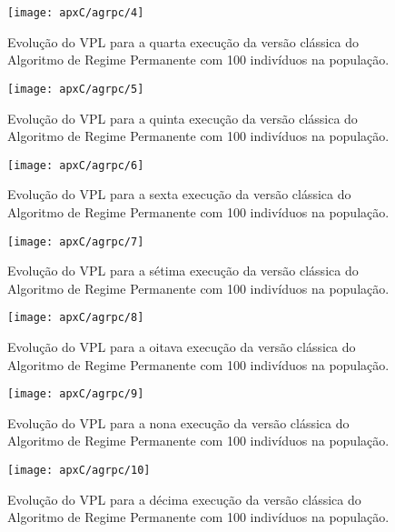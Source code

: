 \begin{figure}[H]
\centering
\texttt{[image: apxC/agrpc/4]}
\caption{Evolução do VPL para a quarta execução da versão clássica do Algoritmo de Regime Permanente com 100 indivíduos na população.}
\label{fig:graphRPC3-04}
\end{figure}

\begin{figure}[H]
\centering
\texttt{[image: apxC/agrpc/5]}
\caption{Evolução do VPL para a quinta execução da versão clássica do Algoritmo de Regime Permanente com 100 indivíduos na população.}
\label{fig:graphRPC3-05}
\end{figure}

\begin{figure}[H]
\centering
\texttt{[image: apxC/agrpc/6]}
\caption{Evolução do VPL para a sexta execução da versão clássica do Algoritmo de Regime Permanente com 100 indivíduos na população.}
\label{fig:graphRPC3-06}
\end{figure}

\begin{figure}[H]
\centering
\texttt{[image: apxC/agrpc/7]}
\caption{Evolução do VPL para a sétima execução da versão clássica do Algoritmo de Regime Permanente com 100 indivíduos na população.}
\label{fig:graphRPC3-07}
\end{figure}

\begin{figure}[H]
\centering
\texttt{[image: apxC/agrpc/8]}
\caption{Evolução do VPL para a oitava execução da versão clássica do Algoritmo de Regime Permanente com 100 indivíduos na população.}
\label{fig:graphRPC3-08}
\end{figure}

\begin{figure}[H]
\centering
\texttt{[image: apxC/agrpc/9]}
\caption{Evolução do VPL para a nona execução da versão clássica do Algoritmo de Regime Permanente com 100 indivíduos na população.}
\label{fig:graphRPC3-09}
\end{figure}

\begin{figure}[H]
\centering
\texttt{[image: apxC/agrpc/10]}
\caption{Evolução do VPL para a décima execução da versão clássica do Algoritmo de Regime Permanente com 100 indivíduos na população.}
\label{fig:graphRPC3-10}
\end{figure}